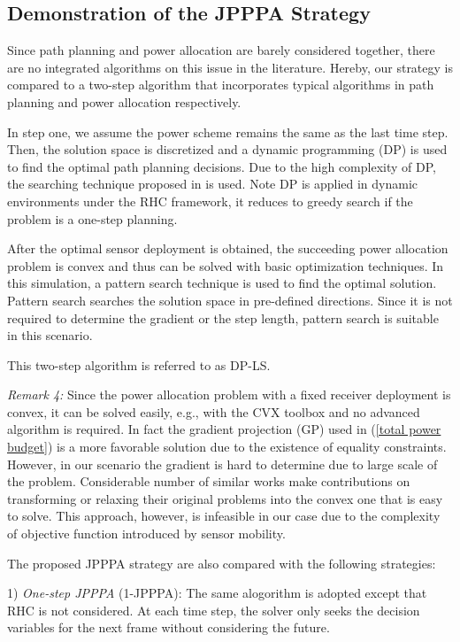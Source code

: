 \documentclass[12pt,journal,draftclsnofoot,onecolumn]{IEEEtran}
\begin{document}
\subsection{Demonstration of the JPPPA Strategy}
Since path planning and power allocation are barely considered together, there are no integrated algorithms on this issue in the literature. Hereby, our strategy is compared to a two-step algorithm that incorporates typical algorithms in path planning\cite{hernandez2004optimal} and power allocation\cite{yan2016joint} respectively.

In step one, we assume the power scheme remains the same as the last time step. Then, the solution space is discretized and a dynamic programming (DP) is used to find the optimal path planning decisions. Due to the high complexity of DP, the searching technique proposed in \cite{hernandez2004optimal} is used. Note DP is applied in dynamic environments under the RHC framework, it reduces to greedy search if the problem is a one-step planning.

After the optimal sensor deployment is obtained, the succeeding power allocation problem is convex\cite{boyd2004convex} and thus can be solved with basic optimization techniques. In this simulation, a pattern search technique\cite{koohifar2016receding} is used to find the optimal solution. Pattern search searches the solution space in pre-defined directions. Since it is not required to determine the gradient or the step length, pattern search is suitable in this scenario.

This two-step algorithm is referred to as DP-LS. 

\emph{Remark 4:} Since the power allocation problem with a fixed receiver deployment is convex, it can be solved easily, e.g., with the CVX toolbox and no advanced algorithm is required. In fact the gradient projection (GP) used in (\ref{total power budget}) is a more favorable solution due to the existence of equality constraints. However, in our scenario the gradient is hard to determine due to large scale of the problem. Considerable number of similar works make contributions on transforming or relaxing their original problems into the convex one that is easy to solve. This approach, however, is infeasible in our case due to the complexity of objective function introduced by sensor mobility.

The proposed JPPPA strategy are also compared with the following strategies:

1) \emph{One-step JPPPA} (1-JPPPA): The same alogorithm is adopted except that RHC is not considered. At each time step, the solver only seeks the decision variables for the next frame without considering the future.
\end{document}
